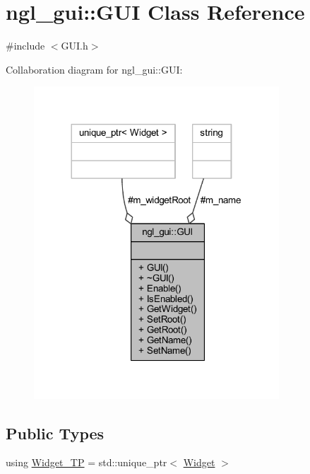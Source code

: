 \hypertarget{classngl__gui_1_1_g_u_i}{}\section{ngl\+\_\+gui\+:\+:G\+UI Class Reference}
\label{classngl__gui_1_1_g_u_i}


{\ttfamily \#include $<$G\+U\+I.\+h$>$}



Collaboration diagram for ngl\+\_\+gui\+:\+:G\+UI\+:\nopagebreak
\begin{figure}[H]
\begin{center}
\leavevmode
\includegraphics[width=260pt]{classngl__gui_1_1_g_u_i__coll__graph}
\end{center}
\end{figure}
\subsection*{Public Types}
\begin{DoxyCompactItemize}
\item 
using \mbox{\hyperlink{classngl__gui_1_1_g_u_i_af4d527c3697ea8524c7af82bb855286d}{Widget\+\_\+\+TP}} = std\+::unique\+\_\+ptr$<$ \mbox{\hyperlink{classngl__gui_1_1_widget}{Widget}} $>$
\end{DoxyCompactItemize}
